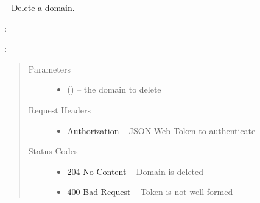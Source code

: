 \documentclass[letterpaper,10pt,english]{sphinxmanual}
\begin{document}
\begin{fulllineitems}
\label{\detokenize{resources/domain:delete--domains-(domain_id)}}~
Delete a domain.

:

\begin{sphinxVerbatim}[commandchars=\\\{\}]
  
 
 
\end{sphinxVerbatim}

:

\begin{sphinxVerbatim}[commandchars=\\\{\}]
  
\end{sphinxVerbatim}
\begin{quote}\begin{description}
\item[{Parameters}] \leavevmode\begin{itemize}
\item {} 
 () -- the domain to delete

\end{itemize}

\item[{Request Headers}] \leavevmode\begin{itemize}
\item {} 
\href{http://tools.ietf.org/html/rfc7235\#section-4.2}{Authorization} -- JSON Web Token to authenticate

\end{itemize}

\item[{Status Codes}] \leavevmode\begin{itemize}
\item {} 
\href{http://www.w3.org/Protocols/rfc2616/rfc2616-sec10.html\#sec10.2.5}{204 No Content} -- Domain is deleted

\item {} 
\href{http://www.w3.org/Protocols/rfc2616/rfc2616-sec10.html\#sec10.4.1}{400 Bad Request} -- Token is not well-formed


\end{itemize}
\end{description}
\end{quote}
\end{fulllineitems}
\end{document}
